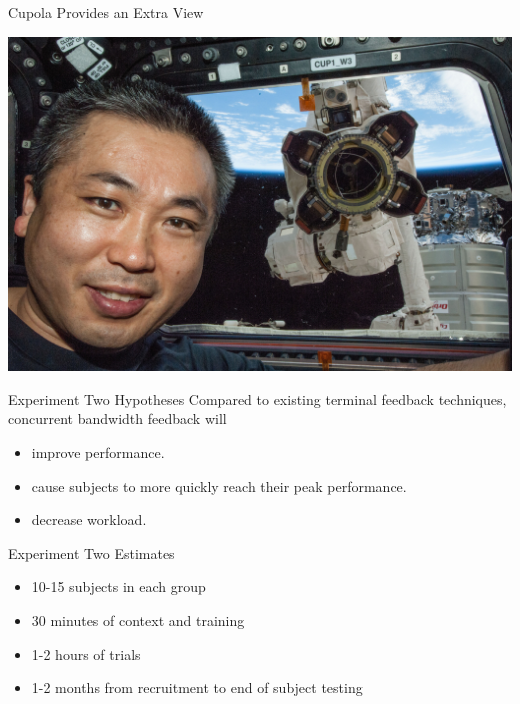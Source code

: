 \documentclass[10pt]{beamer}
\begin{document}
\begin{frame}[fragile]{Cupola Provides an Extra View}
  \begin{center}
    \includegraphics[width=\textwidth]{../img/12085915275_c7f77c537e_k.jpg}
  \end{center}
\end{frame}

\begin{frame}[fragile]{Experiment Two Hypotheses}
Compared to existing terminal feedback techniques, concurrent bandwidth feedback will
  \begin{itemize}
  \item improve performance.
  \item cause subjects to more quickly reach their peak performance.
  \item decrease workload.
  \end{itemize}
\end{frame}

\begin{frame}[fragile]{Experiment Two Estimates}
  \begin{itemize}
    \setlength\itemsep{1em}
    \item 10-15 subjects in each group
    \item 30 minutes of context and training
    \item 1-2 hours of trials
    \item 1-2 months from recruitment to end of subject testing
  \end{itemize}
\end{frame}
\end{document}
